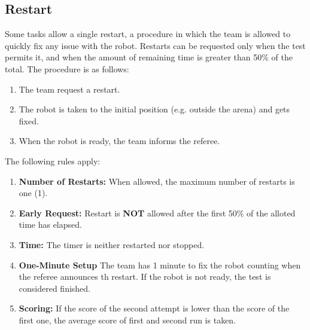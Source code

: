 \subsection{Restart}
\label{rule:restart}
Some tasks allow a single restart, a procedure in which the team is allowed to quickly fix any issue with the robot.
Restarts can be requested only when the test permits it, and when the amount of remaining time is greater than 50\% of the total.
The procedure is as follows:

\begin{enumerate}
	\item The team request a restart.
	\item The robot is taken to the initial position (e.g. outside the arena) and gets fixed.
	\item When the robot is ready, the team informs the referee.
\end{enumerate}

The following rules apply:
\begin{enumerate}
	\item \textbf{Number of Restarts:} When allowed, the maximum number of restarts is one (1).
	
	\item \textbf{Early Request:} Restart is \textbf{NOT} allowed after the first 50\% of the alloted time has elapsed.
	
	\item \textbf{Time:} The timer is neither restarted nor stopped.
	
	\item \textbf{One-Minute Setup} The team has 1 minute to fix the robot counting when the referee announces th restart.
	If the robot is not ready, the test is considered finished.
	
	\item \textbf{Scoring:} If the score of the second attempt is lower than the score of the first one, the average score of first and second run is taken.
\end{enumerate}

